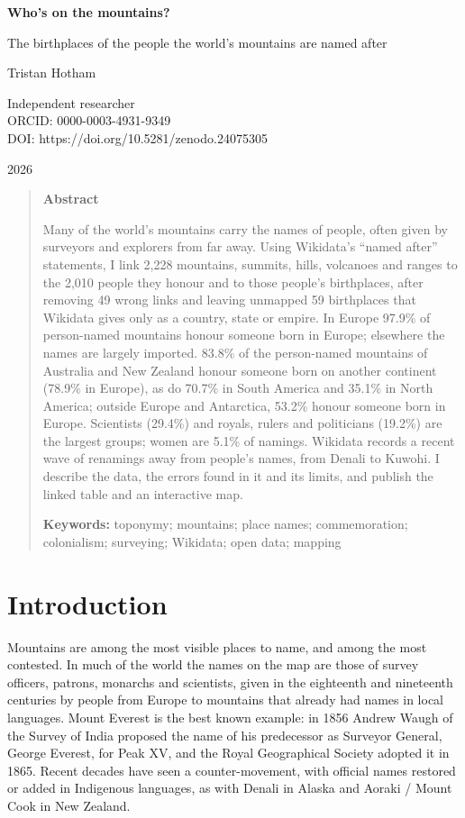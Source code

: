\documentclass[11pt,a4paper]{article}
\begin{document}
\begin{center}
{\Large\bfseries Who's on the mountains?\par}
\vspace{0.4em}
{\large The birthplaces of the people the world's mountains are named after\par}
\vspace{1.2em}
{\large Tristan Hotham\par}
\vspace{0.3em}
{\small Independent researcher\\
ORCID: 0000-0003-4931-9349\\
DOI: https://doi.org/10.5281/zenodo.24075305\par}
\vspace{0.8em}
2026
\end{center}

\begin{quote}
\small
\begin{center}\textbf{Abstract}\end{center}
Many of the world's mountains carry the names of people, often given by surveyors and explorers from far away. Using Wikidata's ``named after'' statements, I link 2,228 mountains, summits, hills, volcanoes and ranges to the 2,010 people they honour and to those people's birthplaces, after removing 49 wrong links and leaving unmapped 59 birthplaces that Wikidata gives only as a country, state or empire. In Europe 97.9\% of person-named mountains honour someone born in Europe; elsewhere the names are largely imported. 83.8\% of the person-named mountains of Australia and New Zealand honour someone born on another continent (78.9\% in Europe), as do 70.7\% in South America and 35.1\% in North America; outside Europe and Antarctica, 53.2\% honour someone born in Europe. Scientists (29.4\%) and royals, rulers and politicians (19.2\%) are the largest groups; women are 5.1\% of namings. Wikidata records a recent wave of renamings away from people's names, from Denali to Kuwohi. I describe the data, the errors found in it and its limits, and publish the linked table and an interactive map.

\textbf{Keywords:} toponymy; mountains; place names; commemoration; colonialism; surveying; Wikidata; open data; mapping
\end{quote}

\section{Introduction}
Mountains are among the most visible places to name, and among the most contested. In much of the world the names on the map are those of survey officers, patrons, monarchs and scientists, given in the eighteenth and nineteenth centuries by people from Europe to mountains that already had names in local languages. Mount Everest is the best known example: in 1856 Andrew Waugh of the Survey of India proposed the name of his predecessor as Surveyor General, George Everest, for Peak XV, and the Royal Geographical Society adopted it in 1865. Recent decades have seen a counter-movement, with official names restored or added in Indigenous languages, as with Denali in Alaska and Aoraki / Mount Cook in New Zealand.
\end{document}
